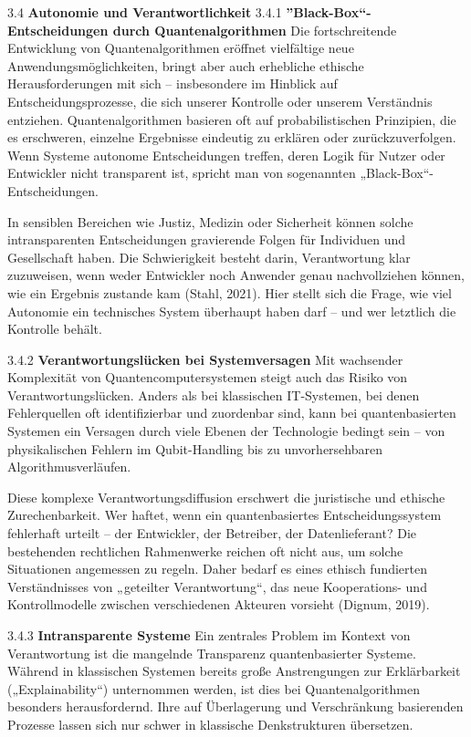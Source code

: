 3.4 \textbf{Autonomie und Verantwortlichkeit}
3.4.1 \textbf{”Black-Box“-Entscheidungen durch Quantenalgorithmen}
Die fortschreitende Entwicklung von Quantenalgorithmen eröffnet vielfältige neue Anwendungsmöglichkeiten, bringt aber auch erhebliche ethische Herausforderungen mit sich – insbesondere im Hinblick auf Entscheidungsprozesse, die sich unserer Kontrolle oder unserem Verständnis entziehen. Quantenalgorithmen basieren oft auf probabilistischen Prinzipien, die es erschweren, einzelne Ergebnisse eindeutig zu erklären oder zurückzuverfolgen. Wenn Systeme autonome Entscheidungen treffen, deren Logik für Nutzer oder Entwickler nicht transparent ist, spricht man von sogenannten „Black-Box“-Entscheidungen.

In sensiblen Bereichen wie Justiz, Medizin oder Sicherheit können solche intransparenten Entscheidungen gravierende Folgen für Individuen und Gesellschaft haben. Die Schwierigkeit besteht darin, Verantwortung klar zuzuweisen, wenn weder Entwickler noch Anwender genau nachvollziehen können, wie ein Ergebnis zustande kam (Stahl, 2021). Hier stellt sich die Frage, wie viel Autonomie ein technisches System überhaupt haben darf – und wer letztlich die Kontrolle behält.

 3.4.2 \textbf{Verantwortungslücken bei Systemversagen}
 Mit wachsender Komplexität von Quantencomputersystemen steigt auch das Risiko von Verantwortungslücken. Anders als bei klassischen IT-Systemen, bei denen Fehlerquellen oft identifizierbar und zuordenbar sind, kann bei quantenbasierten Systemen ein Versagen durch viele Ebenen der Technologie bedingt sein – von physikalischen Fehlern im Qubit-Handling bis zu unvorhersehbaren Algorithmusverläufen.

Diese komplexe Verantwortungsdiffusion erschwert die juristische und ethische Zurechenbarkeit. Wer haftet, wenn ein quantenbasiertes Entscheidungssystem fehlerhaft urteilt – der Entwickler, der Betreiber, der Datenlieferant? Die bestehenden rechtlichen Rahmenwerke reichen oft nicht aus, um solche Situationen angemessen zu regeln. Daher bedarf es eines ethisch fundierten Verständnisses von „geteilter Verantwortung“, das neue Kooperations- und Kontrollmodelle zwischen verschiedenen Akteuren vorsieht (Dignum, 2019).

3.4.3 \textbf{Intransparente Systeme }
Ein zentrales Problem im Kontext von Verantwortung ist die mangelnde Transparenz quantenbasierter Systeme. Während in klassischen Systemen bereits große Anstrengungen zur Erklärbarkeit („Explainability“) unternommen werden, ist dies bei Quantenalgorithmen besonders herausfordernd. Ihre auf Überlagerung und Verschränkung basierenden Prozesse lassen sich nur schwer in klassische Denkstrukturen übersetzen.

